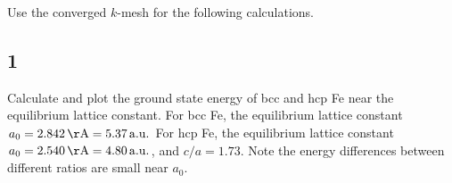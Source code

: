 \documentclass[12pt]{article}
\newcommand{\unit}[1]{\ensuremath{\, \mathrm{#1}}}
\begin{document}
Use the converged $k$-mesh for the following calculations. 

\begin{figure}[h]
\begin{center}
	\quad
\end{center}
\end{figure}

\subsection*{1}

Calculate and plot the ground state energy of bcc and hcp Fe near the equilibrium lattice constant. For bcc Fe, the equilibrium lattice constant $a_0 = 2.842\unit{\AA} = 5.37\unit{a.u.}$ For hcp Fe, the equilibrium lattice constant $a_0 = 2.540\unit{\AA} = 4.80\unit{a.u.}$, and $c/a=1.73$. Note the energy differences between different ratios are small near $a_0$.
\end{document}
